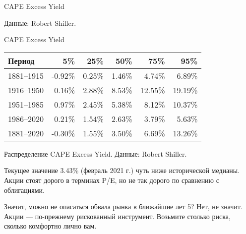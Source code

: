 \documentclass{beamer}
\begin{document}
\begin{frame}{CAPE Excess Yield}
\centering
{}
{\scriptsize Данные: Robert Shiller.}
\end{frame}


\begin{frame}{CAPE Excess Yield}
\centering
\begin{tabular}{l|r|r|r|r|r}
Период     &     5\% &   25\% &   50\% &    75\% &    95\% \\ \hline 
1881--1915 & -0.92\% & 0.25\% & 1.46\% &  4.74\% &  6.89\% \\ 
1916--1950 &  0.16\% & 2.88\% & 8.53\% & 12.55\% & 19.19\% \\
1951--1985 &  0.97\% & 2.45\% & 5.38\% &  8.12\% & 10.37\% \\
1986--2020 &  0.21\% & 1.54\% & 2.63\% &  3.79\% &  5.63\% \\ \hline
1881--2020 & -0.30\% & 1.55\% & 3.50\% &  6.69\% & 13.26\%
\end{tabular}

\centering
{\scriptsize Распределение CAPE Excess Yield. Данные: Robert Shiller.}

\justify
Текущее значение 3.43\% (февраль 2021 г.) чуть ниже исторической медианы. Акции стоят дорого в терминах P/E, но не так дорого по сравнению с облигациями.

\justify
Значит, можно не опасаться обвала рынка в ближайшие лет 5? Нет, не значит. Акции --- по-прежнему рискованный инструмент. Возьмите столько риска, сколько комфортно лично вам.
\end{frame}
\end{document}
